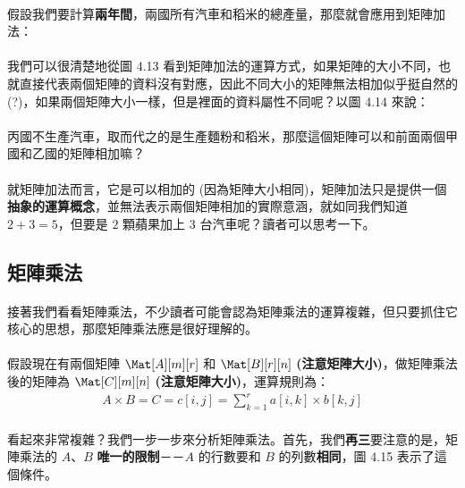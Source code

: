 \documentclass[12pt,a4paper,oneside]{report}
\begin{document}
\begin{CJK}{UTF8}{bkai}
\paragraph{}假設我們要計算\textbf{兩年間}，兩國所有汽車和稻米的總產量，那麼就會應用到矩陣加法：

\paragraph{}我們可以很清楚地從圖 4.13 看到矩陣加法的運算方式，如果矩陣的大小不同，也就直接代表兩個矩陣的資料沒有對應，因此不同大小的矩陣無法相加似乎挺自然的(?)，如果兩個矩陣大小一樣，但是裡面的資料屬性不同呢？以圖 4.14 來說：

\paragraph{}丙國不生產汽車，取而代之的是生產麵粉和稻米，那麼這個矩陣可以和前面兩個甲國和乙國的矩陣相加嘛？

\paragraph{}就矩陣加法而言，它是可以相加的 (因為矩陣大小相同)，矩陣加法只是提供一個\textbf{抽象的運算概念}，並無法表示兩個矩陣相加的實際意涵，就如同我們知道 $2+3=5$，但要是 $2$ 顆蘋果加上 $3$ 台汽車呢？讀者可以思考一下。

\subsection{矩陣乘法}

\paragraph{}接著我們看看矩陣乘法，不少讀者可能會認為矩陣乘法的運算複雜，但只要抓住它核心的思想，那麼矩陣乘法應是很好理解的。

\paragraph{}假設現在有兩個矩陣 $\Mat[A][m][r]$ 和 $\Mat[B][r][n]$ \textbf{(注意矩陣大小)}，做矩陣乘法後的矩陣為 $\Mat[C][m][n]$ \textbf{(注意矩陣大小)}，運算規則為：
\begin{align*}
A\times{B}=C=c[i,j]=\sum^{r}_{k=1}{a[i,k]\times{b[k,j]}}
\end{align*}

\paragraph{}看起來非常複雜？我們一步一步來分析矩陣乘法。首先，我們\textbf{再三}要注意的是，矩陣乘法的 $A$、$B$ \textbf{唯一的限制}－－$A$ 的行數要和 $B$ 的列數\textbf{相同}，圖 4.15 表示了這個條件。


\end{CJK}
\end{document}
